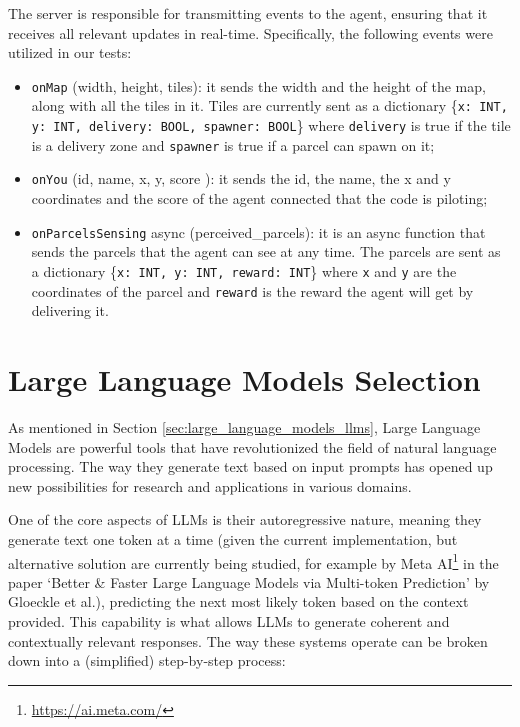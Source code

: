 The server is responsible for transmitting events to the agent, ensuring that it
receives all relevant updates in real-time. Specifically, the following events
were utilized in our tests:

\begin{itemize}
  \item \texttt{onMap} (width, height, tiles): it sends the width and the height
    of the map, along with all the tiles in it. Tiles are currently sent as a dictionary
    \{\texttt{x: INT, y: INT, delivery: BOOL, spawner: BOOL}\} where \texttt{delivery}
    is true if the tile is a delivery zone and \texttt{spawner} is true if a
    parcel can spawn on it;

  \item \texttt{onYou} (id, name, x, y, score ): it sends the id, the name, the
    x and y coordinates and the score of the agent connected that the code is
    piloting;

  \item \texttt{onParcelsSensing} async (perceived\_parcels): it is an async function
    that sends the parcels that the agent can see at any time. The parcels are
    sent as a dictionary \{\texttt{x: INT, y: INT, reward: INT}\} where \texttt{x}
    and \texttt{y} are the coordinates of the parcel and \texttt{reward} is the
    reward the agent will get by delivering it.
\end{itemize}

\section{Large Language Models Selection}
\label{sec:llm_models}

As mentioned in Section \ref{sec:large_language_models_llms}, Large Language Models
are powerful tools that have revolutionized the field of natural language processing.
The way they generate text based on input prompts has opened up new
possibilities for research and applications in various domains.

One of the core aspects of LLMs is their autoregressive nature, meaning they generate
text one token at a time (given the current implementation, but alternative solution
are currently being studied, for example by Meta AI\footnote{\url{https://ai.meta.com/}}
in the paper `Better \& Faster Large Language Models via Multi-token Prediction'
by Gloeckle et al.\cite{gloeckle2024betterfasterlarge}), predicting the next most
likely token based on the context provided. This capability is what allows LLMs
to generate coherent and contextually relevant responses. The way these systems operate
can be broken down into a (simplified) step-by-step process:

